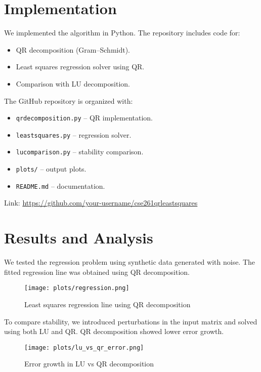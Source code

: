 \documentclass[14pt,a4paper]{article}
\begin{document}
\section{Implementation}
We implemented the algorithm in Python. The repository includes code for:  
\begin{itemize}
    \item QR decomposition (Gram–Schmidt).  
    \item Least squares regression solver using QR.  
    \item Comparison with LU decomposition.  
\end{itemize}

The GitHub repository is organized with:  
\begin{itemize}
    \item \texttt{qrdecomposition.py} – QR implementation.  
    \item \texttt{leastsquares.py} – regression solver.  
    \item \texttt{lucomparison.py} – stability comparison.  
    \item \texttt{plots/} – output plots.  
    \item \texttt{README.md} – documentation.  
\end{itemize}

Link: \url{https://github.com/your-username/cse261qrleastsquares}  

\section{Results and Analysis}
We tested the regression problem using synthetic data generated with noise. The fitted regression line was obtained using QR decomposition.  

\begin{figure}[h]
    \centering
    \texttt{[image: plots/regression.png]}
    \caption{Least squares regression line using QR decomposition}
\end{figure}

To compare stability, we introduced perturbations in the input matrix and solved using both LU and QR. QR decomposition showed lower error growth.  

\begin{figure}[h]
    \centering
    \texttt{[image: plots/lu\_vs\_qr\_error.png]}
    \caption{Error growth in LU vs QR decomposition}
\end{figure}
\end{document}
